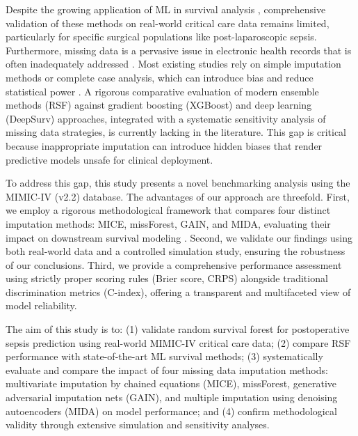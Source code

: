 \documentclass[pdflatex,sn-mathphys-num]{sn-jnl}%
\theoremstyle{thmstyleone}%
\theoremstyle{thmstyletwo}%
\theoremstyle{thmstylethree}%
\begin{document}
Despite the growing application of ML in survival analysis \cite{wang2019machine}, comprehensive validation of these methods on real-world critical care data remains limited, particularly for specific surgical populations like post-laparoscopic sepsis. Furthermore, missing data is a pervasive issue in electronic health records that is often inadequately addressed \cite{emmanuel2021survey, austin2021missing}. Most existing studies rely on simple imputation methods or complete case analysis, which can introduce bias and reduce statistical power \cite{tang2022comparison, austin2021missing}. A rigorous comparative evaluation of modern ensemble methods (RSF) against gradient boosting (XGBoost) and deep learning (DeepSurv) approaches, integrated with a systematic sensitivity analysis of missing data strategies, is currently lacking in the literature. This gap is critical because inappropriate imputation can introduce hidden biases that render predictive models unsafe for clinical deployment.

To address this gap, this study presents a novel benchmarking analysis using the MIMIC-IV (v2.2) database. The advantages of our approach are threefold. First, we employ a rigorous methodological framework that compares four distinct imputation methods: MICE, missForest, GAIN, and MIDA, evaluating their impact on downstream survival modeling \cite{hong2020comparison, tang2022comparison}. Second, we validate our findings using both real-world data and a controlled simulation study, ensuring the robustness of our conclusions. Third, we provide a comprehensive performance assessment using strictly proper scoring rules (Brier score, CRPS) alongside traditional discrimination metrics (C-index), offering a transparent and multifaceted view of model reliability.

The aim of this study is to: (1) validate random survival forest for postoperative sepsis prediction using real-world MIMIC-IV critical care data; (2) compare RSF performance with state-of-the-art ML survival methods; (3) systematically evaluate and compare the impact of four missing data imputation methods: multivariate imputation by chained equations (MICE), missForest, generative adversarial imputation nets (GAIN), and multiple imputation using denoising autoencoders (MIDA) on model performance; and (4) confirm methodological validity through extensive simulation and sensitivity analyses.
\end{document}
